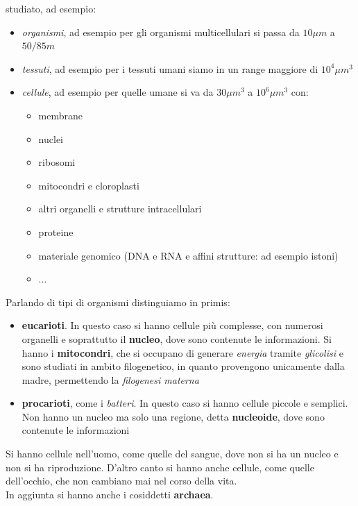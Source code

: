 \documentclass[a4paper,12pt, oneside]{book}
\begin{document}
studiato, ad esempio:
\begin{itemize}
  \item \textit{organismi}, ad esempio per gli organismi multicellulari si passa
  da $10\mu m$ a $50/85m$ 
  \item \textit{tessuti}, ad esempio per i tessuti umani siamo in un range
  maggiore di $10^4 \mu m^3$
  \item \textit{cellule}, ad esempio per quelle umane si va da $30\mu m^3$ a
  $10^6 \mu m^3$ con:
  \begin{itemize}
    \item membrane
    \item nuclei
    \item ribosomi
    \item mitocondri e cloroplasti
    \item altri organelli e strutture intracellulari
    \item proteine
    \item materiale genomico (DNA e RNA e affini strutture: ad esempio istoni) 
    \item $\ldots$
  \end{itemize}
\end{itemize}
Parlando di tipi di organismi distinguiamo in primis:
\begin{itemize}
  \item \textbf{eucarioti}. In questo caso si hanno cellule più complesse, con
  numerosi organelli e soprattutto il \textbf{nucleo}, dove sono contenute le
  informazioni. Si hanno i \textbf{mitocondri}, che si occupano di generare
  \textit{energia} tramite \textit{glicolisi} e sono studiati in ambito
  filogenetico, in quanto provengono 
  unicamente dalla madre, permettendo la \textit{filogenesi materna}
  \item \textbf{procarioti}, come i \textit{batteri}. In questo caso si hanno
  cellule piccole e semplici. Non hanno un nucleo ma solo una regione, detta
  \textbf{nucleoide}, dove sono contenute le informazioni
\end{itemize}
Si hanno cellule nell'uomo, come quelle del sangue, dove non si ha un nucleo e
non si ha riproduzione. D'altro canto si hanno anche cellule, come quelle
dell'occhio, che non cambiano mai nel corso della vita.\\
In aggiunta si hanno anche i cosiddetti \textbf{archaea}.\\
\end{document}
